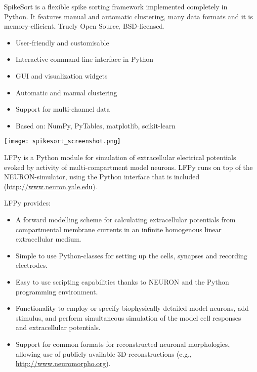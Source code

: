 \begin{multicols}{3}



SpikeSort is a flexible spike sorting framework implemented completely
in Python. It features manual and automatic clustering, many data
formats and it is memory-efficient. Truely Open Source, BSD-licensed.

\begin{itemize}[nolistsep,topsep=0em,leftmargin=1pc]
\item User-friendly and customisable
\item Interactive command-line interface in Python
\item GUI and visualization widgets
\item Automatic and manual clustering
\item Support for multi-channel data
\item Based on: NumPy, PyTables, matplotlib, scikit-learn
\end{itemize}

\texttt{[image: spikesort\_screenshot.png]}
%





LFPy is a Python module for simulation of extracellular electrical potentials evoked 
by activity of multi-compartment model neurons.
LFPy runs on top of the NEURON-simulator, using the Python interface that is included (\url{http://www.neuron.yale.edu}).

LFPy provides:
\begin{itemize}[nolistsep, topsep=0em, leftmargin=1pc]
\item A forward modelling scheme for calculating extracellular potentials from compartmental membrane currents in an infinite homogenous linear extracellular medium.
\item Simple to use Python-classes for setting up the cells, synapses and recording electrodes.
\item Easy to use scripting capabilities thanks to NEURON and the Python programming environment.
\item Functionality to employ or specify biophysically detailed model neurons, add stimulus, and perform simultaneous simulation of the model cell responses and extracellular potentials.
\item Support for common formats for reconstructed neuronal morphologies, allowing use of publicly available 3D-reconstructions (e.g., \url{http://www.neuromorpho.org}). 
\end{itemize}



\end{multicols}
